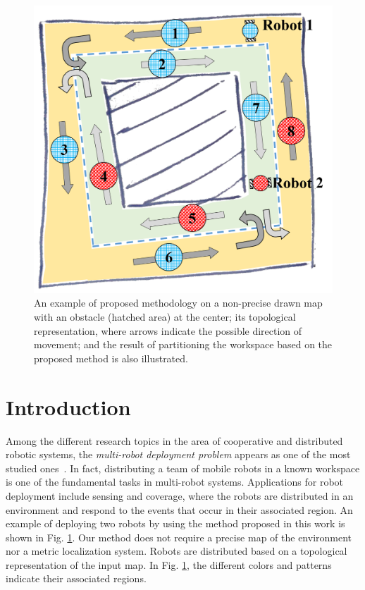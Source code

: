 \documentclass[smallcondensed]{svjour3}
\begin{document}
\begin{figure}[t]
\centering
\includegraphics[width=0.45\columnwidth]{Figures/Fig1.png}
\caption{An example of proposed methodology on a non-precise drawn map with an obstacle (hatched area) at the center; its topological representation, where arrows indicate the possible direction of movement; and the result of partitioning the workspace based on the proposed method is also illustrated.}
\label{fig:map1}
\end{figure}
\section{Introduction}
\sloppy
Among the different research topics in the area of cooperative and distributed robotic systems, the \textit{multi-robot deployment problem} appears as one of the most studied ones~\cite{DistCtrlRobotNetw}. In fact, distributing a team of mobile robots in a known workspace is one of the fundamental tasks in multi-robot systems. Applications for robot deployment include sensing and coverage, where the robots are distributed in an environment and respond to the events that occur in their associated region.
An example of deploying two robots by using the method proposed in this work is shown in Fig. \ref{fig:map1}. Our method does not require a precise map of the environment nor a metric localization system. Robots are distributed based on a topological representation of the input map. In Fig. \ref{fig:map1}, the different colors and patterns indicate their associated regions.
\end{document}
